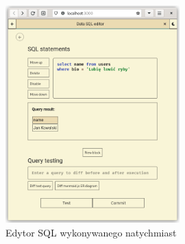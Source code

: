 \begin{figure}[h]
    \centering
    \includegraphics[width=0.6\textwidth]{./img/sql_editor.png}
    \caption{Edytor SQL wykonywanego natychmiast}
    \label{immediateSqlEditorFigure}
\end{figure}

